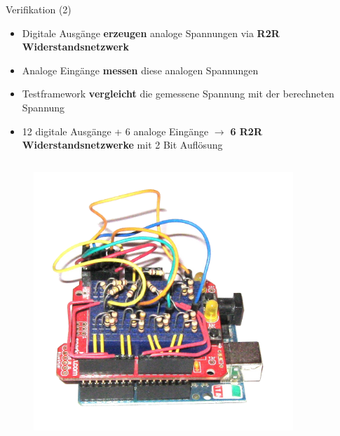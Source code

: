 \documentclass{beamer}
\begin{document}
\begin{frame}{Verifikation (2)}
\begin{itemize}
 \item Digitale Ausg\"ange \textbf{erzeugen} analoge Spannungen via \textbf{R2R Widerstandsnetzwerk}
 \item Analoge Eing\"ange \textbf{messen} diese analogen Spannungen
 \item Testframework \textbf{vergleicht} die gemessene Spannung mit der berechneten Spannung
\end{itemize}
\begin{itemize}
 \item 12 digitale Ausg\"ange + 6 analoge Eing\"ange $\rightarrow$ \textbf{6 R2R Widerstandsnetzwerke} mit 2 Bit Aufl\"osung
\end{itemize}
\begin{columns}
 \begin{column}{0.4\textwidth}
  \begin{figure}[htbp]
   \centering
   \includegraphics[scale=0.2]{./images/arduinoio-r2r.png}
  \end{figure}
 \end{column}
 \begin{column}{0.4\textwidth}
 \begin{figure}[htbp]

\end{figure}
\end{column}
\end{columns}
\end{frame}
\end{document}
